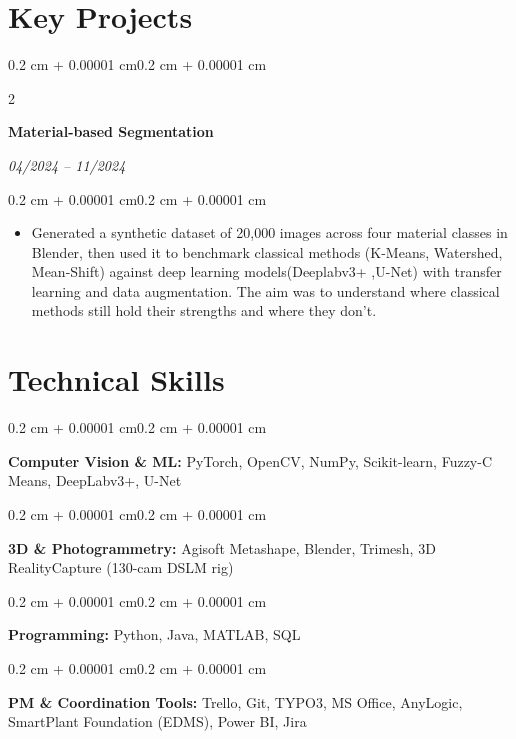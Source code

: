 \documentclass[10pt, a4paper]{article}
\newenvironment{highlights}{
    \begin{itemize}[
        topsep=0.08 cm,
        parsep=0.08 cm,
        partopsep=0pt,
        itemsep=0pt,
        leftmargin=0.4 cm + 10pt
    ]
}{
    \end{itemize}
}
\newenvironment{onecolentry}{
    \begin{adjustwidth}{0.2 cm + 0.00001 cm}{0.2 cm + 0.00001 cm}
}{
    \end{adjustwidth}
}
\newenvironment{twocolentry}[2][]{
    \onecolentry
    \def\secondColumn{#2}
    \setcolumnwidth{\fill, 4.5 cm}
    \begin{paracol}{2}
}{
    \switchcolumn \raggedleft \secondColumn
    \end{paracol}
    \endonecolentry
}
\begin{document}
\section{Key Projects}

\begin{twocolentry}{\textit{04/2024 -- 11/2024}}
    \textbf{Material-based Segmentation}

\end{twocolentry}

\vspace{0.10 cm}
\begin{onecolentry}
    \begin{highlights}
        \item Generated a synthetic dataset of 20{,}000 images across four material classes in Blender, then used it to benchmark classical methods (K-Means, Watershed, Mean-Shift) against deep learning models(Deeplabv3+ ,U-Net) with transfer learning and data augmentation. The aim was to understand where classical methods still hold their strengths and where they don't.
    \end{highlights}
\end{onecolentry}

\section{Technical Skills}

\begin{onecolentry}
    \textbf{Computer Vision \& ML:} PyTorch, OpenCV, NumPy, Scikit-learn, Fuzzy-C Means, DeepLabv3+, U-Net
\end{onecolentry}

\vspace{0.10 cm}
\begin{onecolentry}
    \textbf{3D \& Photogrammetry:} Agisoft Metashape, Blender, Trimesh, 3D RealityCapture (130-cam DSLM rig)
\end{onecolentry}

\vspace{0.10 cm}
\begin{onecolentry}
    \textbf{Programming:} Python, Java, MATLAB, SQL
\end{onecolentry}

\vspace{0.10 cm}
\begin{onecolentry}
    \textbf{PM \& Coordination Tools:} Trello, Git, TYPO3, MS Office, AnyLogic, SmartPlant Foundation (EDMS), Power BI, Jira
\end{onecolentry}
\end{document}
